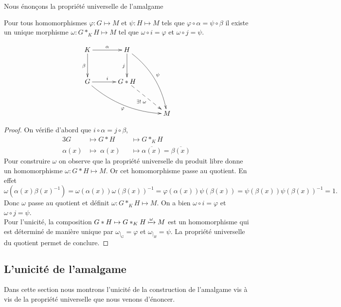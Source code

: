\documentclass[main.tex]{subfiles}
\begin{document}
	\begin{prop}
		Nous énonçons la propriété universelle de l'amalgame \\

		\medskip
		\begin{minipage}{0.5\textwidth}
			Pour tous homomorphismes $\varphi : G \longmapsto M$ et $\psi : H \longmapsto M$ tels que $\varphi \circ \alpha = \psi \circ \beta$ il existe un unique morphisme $\omega : G*_K H \longmapsto M$ tel que $\omega \circ i = \varphi$ et $\omega \circ j = \psi$.
		\end{minipage}	
		\hfill
		\begin{minipage}{0.5\textwidth}
			\[
			\xymatrix@R=1.2cm@C=1.2cm{
				K \ar[r]^{\alpha}      \ar[d]_{\beta}         & H \ar[d]_{j} \ar@/^1pc/[rdd]^{\psi}   \\
			 G \ar[r]^{i} \ar@/_1pc/[rrd]_{\varphi} & G*H \ar@{-->}[rd]_{\exists! \; \omega}             \\
							      &                                   & M 
			}
	\]
		\end{minipage}
	\end{prop}

	\begin{proof}
		On vérifie d'abord que $i \circ \alpha = j \circ \beta$,
		\begin{alignat*}{3}
			G &\mapsto G*H &&\longmapsto G*_K H \\
		\alpha(x) &\mapsto \; \alpha(x) &&\mapsto \overline{\alpha(x)} = \overline{\beta(x)} 
		\end{alignat*}
		Pour construire $\omega$ on observe que la propriété universelle du produit libre donne un homomorphisme $\omega : G*H \longmapsto M$. Or cet homomorphisme passe au quotient. En effet \[\omega(\alpha(x){\beta(x)}^{-1}) = \omega(\alpha(x))\omega(\beta(x))^{-1} = \varphi(\alpha(x))\psi(\beta(x)) = \psi(\beta(x))\psi(\beta(x))^{-1} = 1.\]
		Donc $\omega$ passe au quotient et définit $\omega : G*_K H \longmapsto M$. On a bien $\omega \circ i = \varphi$ et  $\omega \circ j = \psi$. \\
		Pour l'unicité, la composition $G*H \mapsto G*_K H \xmapsto{\omega} M$ est un homomorphisme qui est déterminé de manière unique par $\omega_{|_{{G}}} = \varphi$ et $\omega_{|_{H}}= \psi$. La propriété universelle du quotient permet de conclure.
	\end{proof}

	\subsection{L'unicité de l'amalgame}
	Dans cette section nous montrons l'unicité de la construction de l'amalgame vis à vis de la propriété universelle que nous venons d'énoncer. \\
\end{document}
